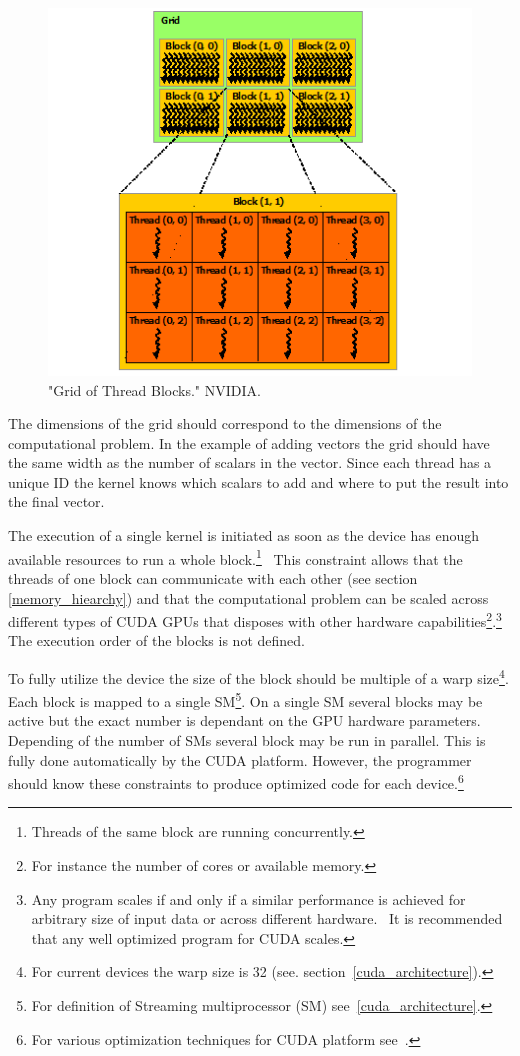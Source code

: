 \documentclass[12pt,oneside]{fithesis2}
\begin{document}
\begin{figure}[H]
	\centering
	\includegraphics[scale=0.9]{figures/grid-of-thread-blocks.png}
	\caption{"Grid of Thread Blocks." NVIDIA. \cite{cuda_guide}}
	\label{fig:grid}
\end{figure}

The dimensions of the grid should correspond to the dimensions of the computational problem. In the example of adding vectors the grid should have the same width as the number of scalars in the vector. Since each thread has a unique ID the kernel knows which scalars to add and where to put the result into the final vector.

The execution of a single kernel is initiated as soon as the device has enough available resources to run a whole block.\footnote{Threads of the same block are running concurrently.}~\cite{cuda_guide} This constraint allows that the threads of one block can communicate with each other (see section \ref{memory_hiearchy}) and that the computational problem can be scaled across different types of CUDA GPUs that disposes with other hardware capabilities\footnote{For instance the number of cores or available memory.}.\footnote{Any program scales if and only if a similar performance is achieved for arbitrary size of input data or across different hardware.~\cite{cuda_best_practices} It is recommended that any well optimized program for CUDA scales.} The execution order of the blocks is not defined.

To fully utilize the device the size of the block should be multiple of a warp size\footnote{For current devices the warp size is 32 (see. section~\ref{cuda_architecture}).}. Each block is mapped to a single SM\footnote{For definition of Streaming multiprocessor (SM) see~\ref{cuda_architecture}.}. On a single SM several blocks may be active but the exact number is dependant on the GPU hardware parameters. Depending of the number of SMs several block may be run in parallel. This is fully done automatically by the CUDA platform. However, the programmer should know these constraints to produce optimized code for each device.\footnote{For various optimization techniques for CUDA platform see~\cite{cuda_best_practices}.}
\end{document}
